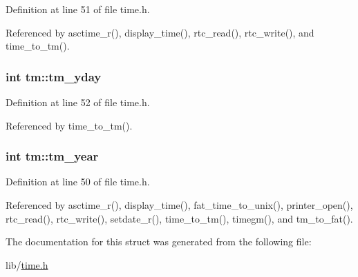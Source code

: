 Definition at line 51 of file time.\-h.



Referenced by asctime\-\_\-r(), display\-\_\-time(), rtc\-\_\-read(), rtc\-\_\-write(), and time\-\_\-to\-\_\-tm().

\hypertarget{structtm_a93a0ba77cc23796df84405dcbcc57eb1}{
\subsubsection[{tm\-\_\-yday}]{\setlength{\rightskip}{0pt plus 5cm}int tm\-::tm\-\_\-yday}}\label{structtm_a93a0ba77cc23796df84405dcbcc57eb1}


Definition at line 52 of file time.\-h.



Referenced by time\-\_\-to\-\_\-tm().

\hypertarget{structtm_a33adf78fd6476b2120ce3b9c4a852053}{
\subsubsection[{tm\-\_\-year}]{\setlength{\rightskip}{0pt plus 5cm}int tm\-::tm\-\_\-year}}\label{structtm_a33adf78fd6476b2120ce3b9c4a852053}


Definition at line 50 of file time.\-h.



Referenced by asctime\-\_\-r(), display\-\_\-time(), fat\-\_\-time\-\_\-to\-\_\-unix(), printer\-\_\-open(), rtc\-\_\-read(), rtc\-\_\-write(), setdate\-\_\-r(), time\-\_\-to\-\_\-tm(), timegm(), and tm\-\_\-to\-\_\-fat().



The documentation for this struct was generated from the following file\-:\begin{DoxyCompactItemize}
\item 
lib/\hyperlink{time_8h}{time.\-h}\end{DoxyCompactItemize}
